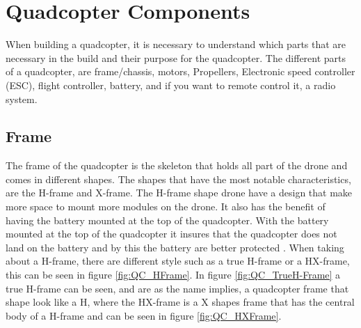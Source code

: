 \section{Quadcopter Components}
When building a quadcopter, it is necessary to understand which parts that are necessary in the build and their purpose for the quadcopter.
The different parts of a quadcopter, are frame/chassis, motors, Propellers, Electronic speed controller (ESC), flight controller, battery, and if you want to remote control it, a radio system.

%
%
\subsection{Frame}
 The frame of the quadcopter is the skeleton that holds all part of the drone and comes in different shapes. The shapes that have the most notable characteristics, are the H-frame and X-frame.
 \newline
 \newline
The H-frame shape drone have a design that make more space to mount more modules on the drone. It also has the benefit of  having the battery mounted at the top of the quadcopter. With the battery mounted at the top of the quadcopter it insures that the quadcopter does not land on the battery and by this the battery are better protected \cite{FPVFrame}.
\newline
\newline
When taking about a H-frame, there are different style such as a true H-frame or a HX-frame, this can be seen in figure \ref{fig:QC_HFrame}. In figure \ref{fig:QC_TrueH-Frame} a true H-frame can be seen, and are as the name implies, a quadcopter frame that shape look like a H, where the HX-frame is a X shapes frame that has the central body of a H-frame and can be seen in figure \ref{fig:QC_HXFrame}.
